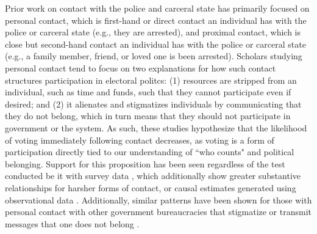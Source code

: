 \documentclass[12pt]{article}
\begin{document}
Prior work on contact with the police and carceral state has primarily focused on personal contact, which is first-hand or direct contact an individual has with the police or carceral state (e.g., they are arrested), and proximal contact, which is close but second-hand contact an individual has with the police or carceral state (e.g., a family member, friend, or loved one is been arrested). 
Scholars studying personal contact tend to focus on two explanations for how such contact structures participation in electoral politcs: (1) resources are stripped from an individual, such as time and funds, such that they cannot participate even if desired; and (2) it alienates and stigmatizes individuals by communicating that they do not belong, which in turn means that they should not participate in government or the system. As such, these studies hypothesize that the likelihood of voting immediately following contact decreases, as voting is a form of participation directly tied to our understanding of ``who counts" and political belonging. Support for this proposition has been seen regardless of the test conducted be it with survey data \citep[e.g., ][]{lerman2014arresting,weaver2010political}, which additionally show greater substantive relationships for harsher forms of contact, or causal estimates generated using observational data \citep{white2019misdemeanor}. Additionally, similar patterns have been shown for those with personal contact with other government bureaucracies that stigmatize or transmit messages that one does not belong \citep[e.g., ][]{soss1999lessons,michener2018fragmented}. 
\end{document}
